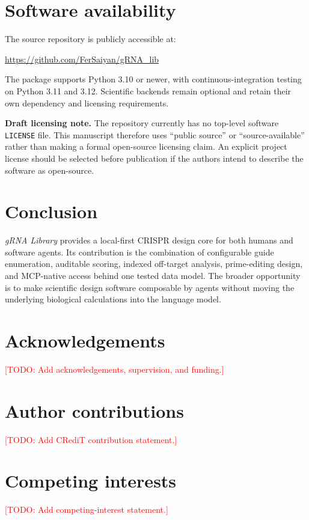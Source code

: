 \documentclass[11pt]{article}
\newcommand{\grnalib}{\textit{gRNA Library}}
\newcommand{\todo}[1]{\textcolor{red}{[TODO: #1]}}
\begin{document}
\section{Software availability}

The source repository is publicly accessible at:
\begin{center}
\url{https://github.com/FerSaiyan/gRNA_lib}
\end{center}

The package supports Python 3.10 or newer, with continuous-integration testing on Python 3.11 and 3.12. Scientific backends remain optional and retain their own dependency and licensing requirements.

\textbf{Draft licensing note.} The repository currently has no top-level software \texttt{LICENSE} file. This manuscript therefore uses ``public source'' or ``source-available'' rather than making a formal open-source licensing claim. An explicit project license should be selected before publication if the authors intend to describe the software as open-source.

\section{Conclusion}

\grnalib{} provides a local-first CRISPR design core for both humans and software agents. Its contribution is the combination of configurable guide enumeration, auditable scoring, indexed off-target analysis, prime-editing design, and MCP-native access behind one tested data model. The broader opportunity is to make scientific design software composable by agents without moving the underlying biological calculations into the language model.

\section*{Acknowledgements}
\todo{Add acknowledgements, supervision, and funding.}

\section*{Author contributions}
\todo{Add CRediT contribution statement.}

\section*{Competing interests}
\todo{Add competing-interest statement.}



\end{document}
